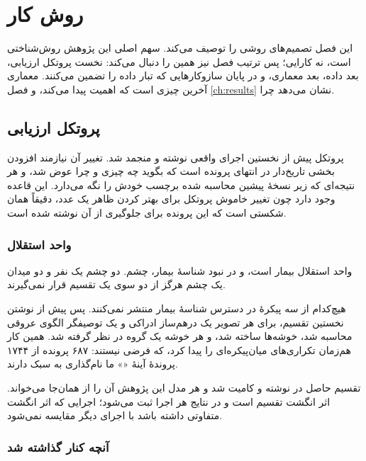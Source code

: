 
\chapter{روش کار}
\label{ch:method}

این فصل تصمیم‌های روشی را توصیف می‌کند. سهم اصلی این پژوهش روش‌شناختی است، نه کارایی؛ پس
ترتیب فصل نیز همین را دنبال می‌کند: نخست پروتکل ارزیابی، بعد داده، بعد معماری، و در پایان
سازوکارهایی که تبار داده را تضمین می‌کنند. معماری آخرین چیزی است که اهمیت پیدا می‌کند، و
فصل \ref{ch:results} نشان می‌دهد چرا.

\section{پروتکل ارزیابی}

پروتکل پیش از نخستین اجرای واقعی نوشته و منجمد شد. تغییر آن نیازمند افزودن بخشی تاریخ‌دار در
انتهای پرونده است که بگوید چه چیزی و چرا عوض شد، و هر نتیجه‌ای که زیر نسخهٔ پیشین محاسبه شده
برچسب خودش را نگه می‌دارد. این قاعده وجود دارد چون تغییر خاموش پروتکل برای بهتر کردن ظاهر یک
عدد، دقیقاً همان شکستی است که این پرونده برای جلوگیری از آن نوشته شده است.

\subsection{واحد استقلال}

واحد استقلال بیمار است، و در نبود شناسهٔ بیمار، چشم. دو چشم یک نفر و دو میدان یک چشم هرگز از
دو سوی یک تقسیم قرار نمی‌گیرند.

هیچ‌کدام از سه پیکرهٔ در دسترس شناسهٔ بیمار منتشر نمی‌کنند. پس پیش از نوشتن نخستین تقسیم، برای
هر تصویر یک درهم‌ساز ادراکی و یک توصیفگر الگوی عروقی محاسبه شد، خوشه‌ها ساخته شد، و هر خوشه یک
گروه در نظر گرفته شد. همین کار هم‌زمان تکراری‌های میان‌پیکره‌ای را پیدا کرد، که فرضی نیستند:
\num{۶۸۷} پرونده از \num{۱۷۴۴} پروندهٔ آینهٔ «» ما نام‌گذاری به سبک  دارند.

تقسیم حاصل در  نوشته و کامیت شد و هر مدل این پژوهش آن را از همان‌جا می‌خواند.
اثر انگشت تقسیم  است و در نتایج هر اجرا ثبت می‌شود؛ اجرایی که اثر انگشت
متفاوتی داشته باشد با اجرای دیگر مقایسه نمی‌شود.

\subsection{آنچه کنار گذاشته شد}

